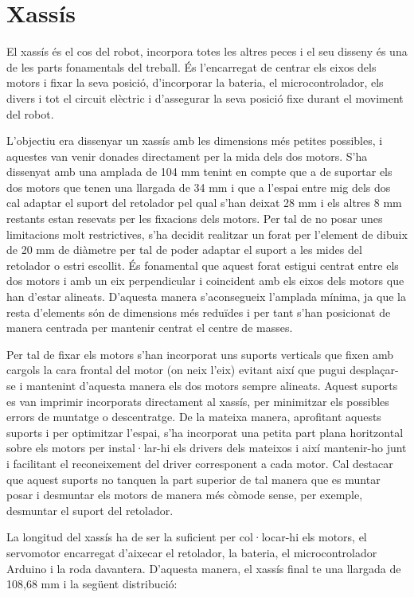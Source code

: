 \section{Xassís}

El xassís és el cos del robot, incorpora totes les altres peces i el seu disseny és una de les parts fonamentals del treball. És l’encarregat de centrar els eixos dels motors i fixar la seva posició, d’incorporar la bateria, el microcontrolador, els divers i tot el circuit elèctric i d'assegurar la seva posició fixe durant el moviment del robot. 
 
L’objectiu era dissenyar un xassís amb les dimensions més petites possibles, i aquestes van venir donades directament per la mida dels dos motors. S’ha dissenyat  amb una amplada de 104 mm tenint en compte que a de suportar els dos motors que tenen una llargada de 34 mm i que a l’espai entre mig dels dos cal adaptar el suport del retolador pel qual s'han deixat 28 mm i els altres 8 mm restants estan resevats per les fixacions dels motors. Per tal de no posar unes limitacions molt restrictives, s’ha decidit realitzar un forat per l’element de dibuix de 20 mm de diàmetre per tal de poder adaptar el suport a les mides del retolador o estri escollit. És fonamental que aquest forat estigui centrat entre els dos motors i amb un eix perpendicular i coincident amb els eixos dels motors que han d’estar alineats. D’aquesta manera s’aconsegueix l’amplada mínima, ja que la resta d’elements són de dimensions més reduïdes i per tant s’han posicionat de manera centrada per mantenir centrat el centre de masses. 

Per tal de fixar els motors s’han incorporat uns suports verticals que fixen amb cargols la cara frontal del motor (on neix l’eix) evitant així que pugui desplaçar-se i mantenint d’aquesta manera els dos motors sempre alineats. Aquest suports es van imprimir incorporats directament al xassís, per minimitzar els possibles errors de muntatge o descentratge. De la mateixa manera, aprofitant aquests suports i per optimitzar l’espai, s’ha incorporat una petita part plana horitzontal sobre els motors per instal·lar-hi els drivers dels mateixos i així mantenir-ho junt i facilitant el reconeixement del driver corresponent a cada motor. Cal destacar que aquest suports no tanquen la part superior de tal manera que es muntar posar i desmuntar els motors de manera més còmode sense, per exemple, desmuntar el suport del retolador. 

La longitud del xassís ha de ser la suficient per col·locar-hi els motors, el servomotor encarregat d’aixecar el retolador, la bateria, el microcontrolador Arduino i la roda davantera. D’aquesta manera, el xassís final te una llargada de 108,68 mm i la següent distribució: 

